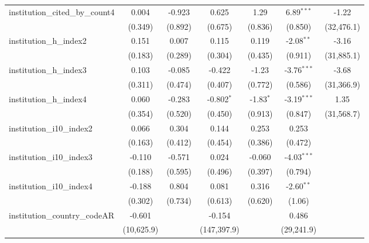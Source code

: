 \begin{tabular}{lcccccc}
   institution\_cited\_by\_count4        & 0.004         & -0.923        & 0.625         & 1.29        & 6.89$^{***}$  & -1.22\\   
                                         & (0.349)       & (0.892)       & (0.675)       & (0.836)     & (0.850)       & (32,476.1)\\   
   institution\_h\_index2                & 0.151         & 0.007         & 0.115         & 0.119       & -2.08$^{**}$  & -3.16\\   
                                         & (0.183)       & (0.289)       & (0.304)       & (0.435)     & (0.911)       & (31,885.1)\\   
   institution\_h\_index3                & 0.103         & -0.085        & -0.422        & -1.23       & -3.76$^{***}$ & -3.68\\   
                                         & (0.311)       & (0.474)       & (0.407)       & (0.772)     & (0.586)       & (31,366.9)\\   
   institution\_h\_index4                & 0.060         & -0.283        & -0.802$^{*}$  & -1.83$^{*}$ & -3.19$^{***}$ & 1.35\\   
                                         & (0.354)       & (0.520)       & (0.450)       & (0.913)     & (0.847)       & (31,568.7)\\   
   institution\_i10\_index2              & 0.066         & 0.304         & 0.144         & 0.253       & 0.253         &   \\   
                                         & (0.163)       & (0.412)       & (0.454)       & (0.386)     & (0.472)       &   \\   
   institution\_i10\_index3              & -0.110        & -0.571        & 0.024         & -0.060      & -4.03$^{***}$ &   \\   
                                         & (0.188)       & (0.595)       & (0.496)       & (0.397)     & (0.794)       &   \\   
   institution\_i10\_index4              & -0.188        & 0.804         & 0.081         & 0.316       & -2.60$^{**}$  &   \\   
                                         & (0.302)       & (0.734)       & (0.613)       & (0.620)     & (1.06)        &   \\   
   institution\_country\_codeAR          & -0.601        &               & -0.154        &             & 0.486         &   \\   
                                         & (10,625.9)    &               & (147,397.9)   &             & (29,241.9)    &   \\   

\end{tabular}
